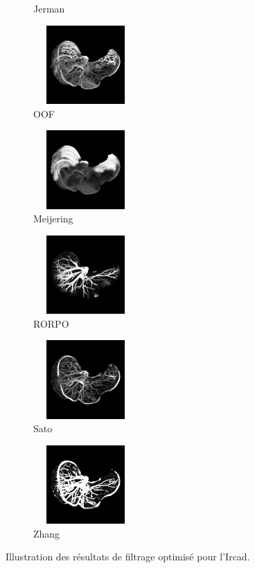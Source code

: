 \begin{figure}[!ht]
\begin{subfigure}[t]{0.32\textwidth}
  \caption{Jerman}
  \end{subfigure}
  \begin{subfigure}[t]{0.32\textwidth}
  \includegraphics[clip = true, trim  =  10 150 10 150, height=3cm,width=4cm]{Images/Ircad_OOF_GM.png}
  \caption{OOF}
  \end{subfigure}
  \begin{subfigure}[t]{0.32\textwidth}
  \includegraphics[clip = true, trim  =  10 150 10 150, height=3cm,width=4cm]{Images/Ircad_Meijering.png}
  \caption{Meijering}
  \end{subfigure}
  \begin{subfigure}[t]{0.32\textwidth}
  \includegraphics[clip = true, trim  =  10 150 10 150, height=3cm,width=4cm]{Images/Ircad_RORPO.png}
  \caption{RORPO}
  \end{subfigure}
  \begin{subfigure}[t]{0.32\textwidth}
  \includegraphics[clip = true, trim  =  10 150 10 150, height=3cm,width=4cm]{Images/Ircad_Sato.png}
  \caption{Sato}
  \end{subfigure}
  \begin{subfigure}[t]{0.32\textwidth}
  \includegraphics[clip = true, trim  =  10 150 10 150, height=3cm,width=4cm]{Images/Ircad_Zhang.png}
  \caption{Zhang}
  \end{subfigure}
  \centering
  \caption{Illustration des résultats de filtrage optimisé pour l'Ircad.}
  \label{fig:qualitative results Ircad}
  \end{figure}

